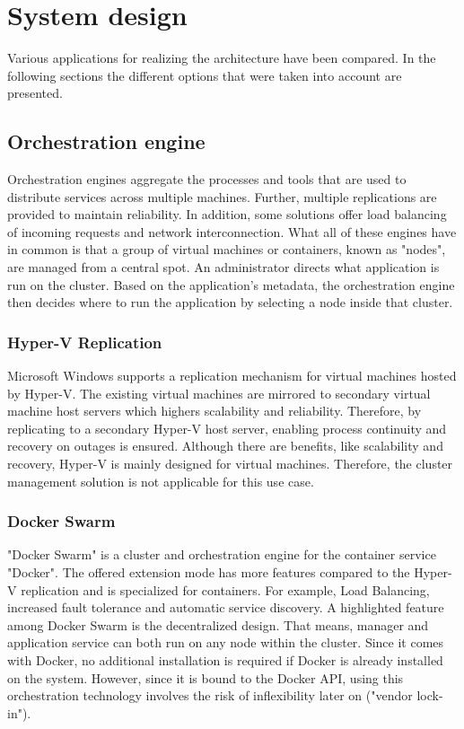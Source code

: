 \chapter{System design} %

\label{chap:design} %

Various applications for realizing the architecture have been compared. In the following sections the different options that were taken into account are presented.

\section{Orchestration engine}
Orchestration engines aggregate the processes and tools that are used to distribute services across multiple machines. Further, multiple replications are provided to maintain reliability. In addition, some solutions offer load balancing of incoming requests and network interconnection.
What all of these engines have in common is that a group of virtual machines or containers, known as "nodes", are managed from a central spot. An administrator directs what application is run on the cluster. Based on the application's metadata, the orchestration engine then decides where to run the application by selecting a node inside that cluster.

\subsection{Hyper-V Replication} Microsoft \ac{Windows} supports a replication mechanism for virtual machines hosted by Hyper-V. The existing virtual machines are mirrored to secondary virtual machine host servers which highers scalability and reliability. Therefore, by replicating to a secondary Hyper-V host server, enabling process continuity and recovery on outages is ensured.
Although there are benefits, like scalability and recovery, Hyper-V is mainly designed for virtual machines. Therefore, the cluster management solution is not applicable for this use case.

\subsection{Docker Swarm} "Docker Swarm" is a cluster and orchestration engine for the container service "Docker". The offered extension mode has more features compared to the Hyper-V replication and is specialized for containers. For example, Load Balancing, increased fault tolerance and automatic service discovery.
A highlighted feature among Docker Swarm is the decentralized design. That means, manager and application service can both run on any node within the cluster. Since it comes with Docker, no additional installation is required if Docker is already installed on the system.
However, since it is bound to the Docker \ac{API}, using this orchestration technology involves the risk of inflexibility later on ("vendor lock-in").

